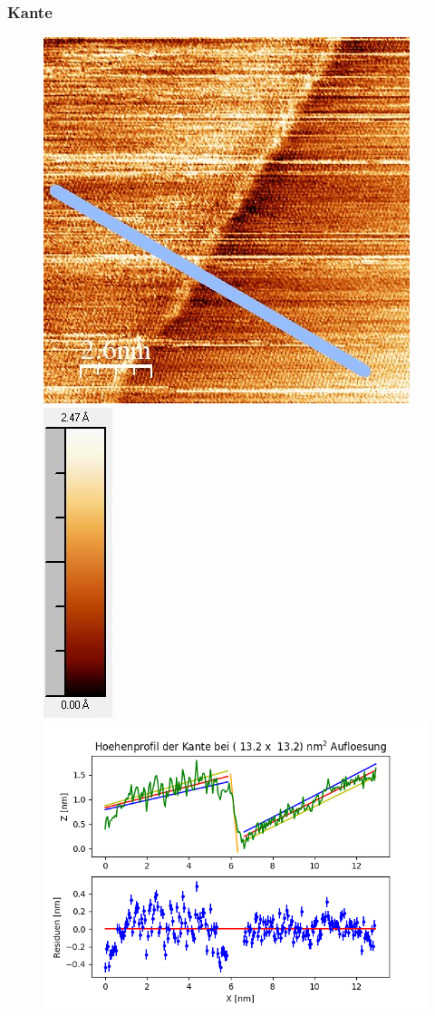 \documentclass[12pt,a4paper]{article}
\begin{document}
\subsubsection{Kante}
\begin{figure}[H]
\centering
\includegraphics[scale=0.59]{Bilder/Anhang/Kante/0132_Kante_vor.jpg}
\includegraphics[scale=0.7]{Bilder/Anhang/Kante/0132_Kante_vor_Skala.jpg}
\includegraphics[scale=0.55]{Bilder/Anhang/Kante/Profil_Kante_0132_vor.png}

\end{figure}
\end{document}
